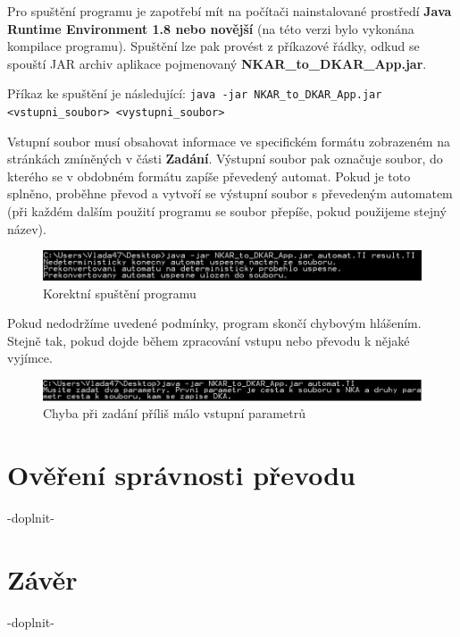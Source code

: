 \documentclass[11pt]{article}
\begin{document}
Pro spuštění programu je zapotřebí mít na počítači nainstalované prostředí \textbf{Java Runtime Environment 1.8 nebo novější} (na této verzi bylo vykonána kompilace programu). Spuštění lze pak provést z příkazové řádky, odkud se spouští JAR archiv aplikace pojmenovaný \textbf{NKAR\_to\_DKAR\_App.jar}.

Příkaz ke spuštění je následující: \texttt{java -jar NKAR\_to\_DKAR\_App.jar <vstupni\_soubor> <vystupni\_soubor>}

Vstupní soubor musí obsahovat informace ve specifickém formátu zobrazeném na stránkách zmíněných v části \textbf{Zadání}. Výstupní soubor pak označuje soubor, do kterého se v obdobném formátu zapíše převedený automat. Pokud je toto splněno, proběhne převod a vytvoří se výstupní soubor s převedeným automatem (při každém dalším použití programu se soubor přepíše, pokud použijeme stejný název).

\begin{figure}[htbp]
\centering
\includegraphics[width = 15cm]{success.jpg}
\begin{center}
\caption{Korektní spuštění programu}
\end{center}
\end{figure}

Pokud nedodržíme uvedené podmínky, program skončí chybovým hlášením. Stejně tak, pokud dojde během zpracování vstupu nebo převodu k nějaké vyjímce.

\begin{figure}[htbp]
\centering
\includegraphics[width = 15cm]{fail.jpg}
\begin{center}
\caption{Chyba při zadání příliš málo vstupní parametrů}
\end{center}
\end{figure}

\newpage

\section{Ověření správnosti převodu}

-doplnit-

\newpage

\section{Závěr}

-doplnit-
\end{document}
